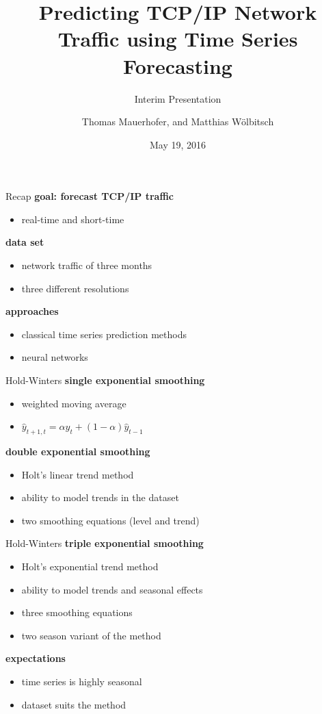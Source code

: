 \documentclass{beamer}
\title{Predicting TCP/IP Network Traffic using Time Series Forecasting}
\subtitle{Interim Presentation}
\date{May 19, 2016}
\author{Thomas Mauerhofer, and Matthias Wölbitsch}
\begin{document}
  \maketitle
  
  \begin{frame}{Recap}   
    \textbf{goal: forecast TCP/IP traffic}
    \begin{itemize}
     \item real-time and short-time
    \end{itemize}
    
    \textbf{data set}
    \begin{itemize}
     \item network traffic of three months
     \item three different resolutions
    \end{itemize}
    
    \textbf{approaches}
    \begin{itemize}
     \item classical time series prediction methods
     \item neural networks
    \end{itemize}
  \end{frame}
 
 
  \begin{frame}{Hold-Winters}
  \textbf{single exponential smoothing}
  \begin{itemize}
   \item weighted moving average
   \item \( \hat{y}_{t+1,t} = \alpha y_t + (1 - \alpha) \hat{y}_{t-1}\)
  \end{itemize}
  
  \textbf{double exponential smoothing}
  \begin{itemize}
   \item Holt's linear trend method
   \item ability to model trends in the dataset
   \item two smoothing equations (level and trend)
  \end{itemize}
  \end{frame}
  
  \begin{frame}{Hold-Winters}
  \textbf{triple exponential smoothing}
  \begin{itemize}
   \item Holt's exponential trend method
   \item ability to model trends and seasonal effects
   \item three smoothing equations
   \item two season variant of the method
  \end{itemize}
  
  
  \textbf{expectations}
  \begin{itemize}
   \item time series is highly seasonal
   \item dataset suits the method
  \end{itemize}
  \end{frame}
\end{document}
